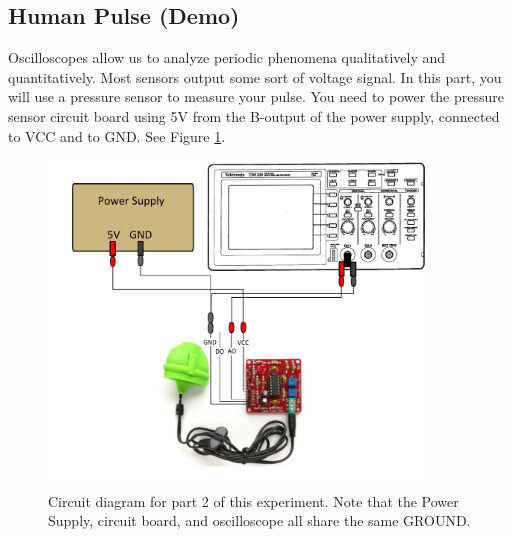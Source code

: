 \subsection{Human Pulse (Demo)}

Oscilloscopes allow us to analyze periodic phenomena qualitatively and quantitatively. Most sensors output some sort of voltage signal. In this part, you will use a pressure sensor to measure your pulse. You need to power the pressure sensor circuit board using 5V from the B-output of the power supply, connected to VCC and to GND. See Figure \ref{fig:part2}.

\begin{figure}[h!]
        \centering
            \includegraphics[width=0.9\textwidth]{./Exp1-10/pic/part2.pdf}
        \caption{Circuit diagram for part 2 of this experiment. Note that the Power Supply, circuit board, and oscilloscope all share the same GROUND.}
        \label{fig:part2}
\end{figure}


